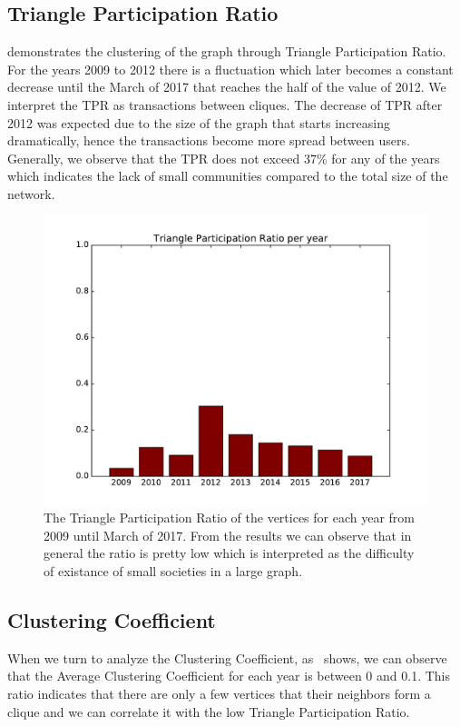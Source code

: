 \subsection{Triangle Participation Ratio}
 demonstrates the clustering of the graph through Triangle Participation Ratio. For the years 2009 to 2012 there is a fluctuation which later becomes a constant decrease until the March of 2017 that reaches the half of the value of 2012. We interpret the TPR as transactions between cliques. The decrease of TPR after 2012 was expected due to the size of the graph that starts increasing dramatically, hence the transactions become more spread between users. Generally, we observe that the TPR does not exceed 37\% for any of the years which indicates the lack of small communities compared to the total size of the network.


\begin{figure}[h!]
\includegraphics[width=1\linewidth]{./images/tpr}
\centering
\caption{The Triangle Participation Ratio of the vertices for each year from 2009 until March of 2017. From the results we can observe that in general the ratio is pretty low which is interpreted as the difficulty of existance of small societies in a large graph.}
\label{fig:fig4}
\end{figure}

\subsection{Clustering Coefficient}
When we turn to analyze the Clustering Coefficient, as~ shows,
we can observe that the Average Clustering Coefficient for each year is between
0 and 0.1. This ratio indicates that there are only a few vertices that their
neighbors form a clique and we can correlate it with the low Triangle
Participation Ratio.

